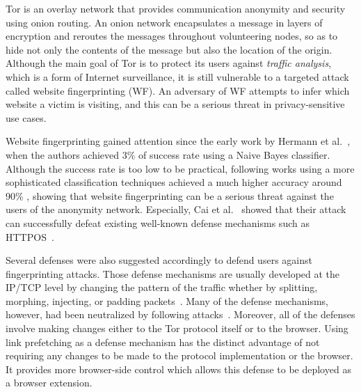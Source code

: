 
Tor is an overlay network that provides communication anonymity and security using onion routing.
An onion network encapsulates a message in layers of encryption and reroutes the messages throughout volunteering nodes, so as to hide not only the contents of the message but also the location of the origin.
Although the main goal of Tor is to protect its users against {\it traffic analysis}, which is a form of Internet surveillance, it is still vulnerable to a targeted attack called website fingerprinting (WF).
An adversary of WF attempts to infer which website a victim is visiting, and this can be a serious threat in privacy-sensitive use cases.

Website fingerprinting gained attention since the early work by Hermann et al.~\cite{hermann}, when the authors achieved 3\% of success rate using a Naive Bayes classifier.
Although the success rate is too low to be practical, following works using a more sophisticated classification techniques achieved a much higher accuracy around 90\% \cite{panchenko11, wang2013improved, cai2012touching}, showing that website fingerprinting can be a serious threat against the users of the anonymity network.
Especially, Cai et al.~\cite{cai2012touching} showed that their attack can successfully defeat existing well-known defense mechanisms such as HTTPOS~\cite{luo2011}.

Several defenses were also suggested accordingly to defend users against fingerprinting attacks.
Those defense mechanisms are usually developed at the IP/TCP level by changing the pattern of the traffic whether by splitting, morphing, injecting, or padding packets~\cite{fu2003, wright2009, luo2011, perry11}.
Many of the defense mechanisms, however, had been neutralized by following attacks~\cite{cai2012touching}.
Moreover, all of the defenses involve making changes either to the Tor protocol itself or to the browser. Using link prefetching as a defense mechanism has the distinct advantage of not requiring any changes to be made to the protocol implementation or the browser. It provides more browser-side control which allows this defense to be deployed as a browser extension. 

